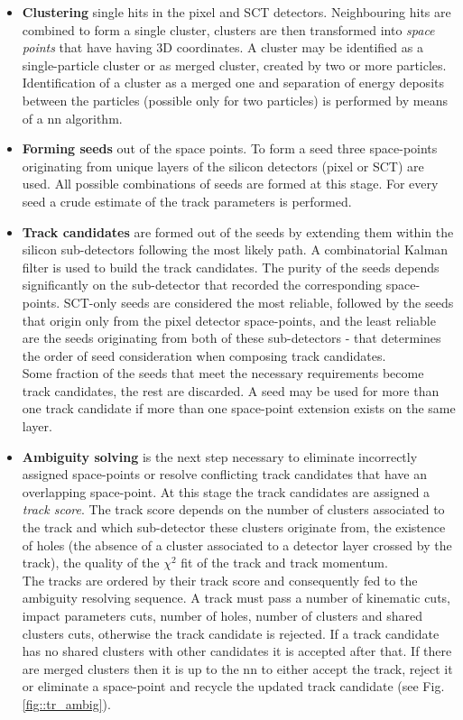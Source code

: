   	\begin{itemize}
  		\item \textbf{Clustering} single hits in the pixel and SCT detectors. Neighbouring hits are combined to form a single cluster, clusters are then transformed into \textit{space points} that have having 3D coordinates. A cluster may be identified as a single-particle cluster or as merged cluster, created by two or more particles. Identification of a cluster as a merged one and separation of energy deposits between the particles (possible only for two particles) is performed by means of a \gls{nn} algorithm. 
  		\item \textbf{Forming seeds} out of the space points. To form a seed three space-points originating from unique layers of the silicon detectors (pixel or SCT) are used. All possible combinations of seeds are formed at this stage. For every seed a crude estimate of the track parameters is performed. 
  		\item \textbf{Track candidates} are formed out of the seeds by extending them within the silicon sub-detectors following the most likely path. A combinatorial Kalman filter \cite{Fruhwirth:1987fm} is used to build the track candidates. The purity of the seeds depends significantly on the sub-detector that recorded the corresponding space-points. SCT-only seeds are considered the most reliable, followed by the seeds that origin only from the pixel detector space-points, and the least reliable are the seeds originating from both of these sub-detectors -  that determines the order of seed consideration when composing track candidates. \\Some fraction of the seeds that meet the necessary requirements become track candidates, the rest are discarded. A seed may be used for more than one track candidate if more than one space-point extension exists on the same layer.
  		\item \textbf{Ambiguity solving} is the next step necessary to eliminate incorrectly assigned space-points or resolve conflicting track candidates that have an overlapping space-point. At this stage the track candidates are assigned a \textit{track score}. The track score depends on the number of clusters associated to the track and which sub-detector these clusters originate from, the existence of holes (the absence of a cluster associated to a detector layer crossed by the track), the quality of the $\chi^2$ fit of the track and track momentum.\\
  		The tracks are ordered by their track score and consequently fed to the ambiguity resolving sequence. A track must pass a number of kinematic cuts, impact parameters cuts, number of holes, number of clusters and shared clusters cuts, otherwise the track candidate is rejected. If a track candidate has no shared clusters with other candidates it is accepted after that. If there are merged clusters then it is up to the \gls{nn} to either accept the track, reject it or eliminate a space-point and recycle the updated track candidate (see Fig. \ref{fig::tr_ambig}). 

\end{itemize}
